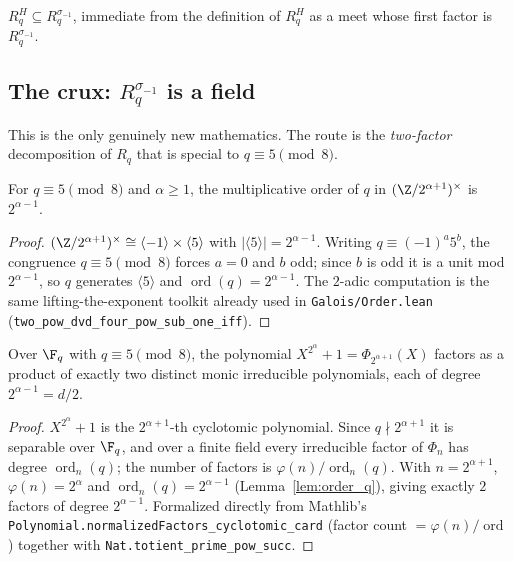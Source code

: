 \begin{lemma}[$R_q^H \le R_q^{\sigma_{-1}}$]\label{lem:fixedSubring_le_conjFixedSubring}
\leanok
{}
$R_q^H \subseteq R_q^{\sigma_{-1}}$, immediate from the definition of $R_q^H$ as a meet whose first
factor is $R_q^{\sigma_{-1}}$.
\end{lemma}

\subsection{The crux: \texorpdfstring{$R_q^{\sigma_{-1}}$}{R\_q\^{}σ(-1)} is a field}

This is the only genuinely new mathematics. The route is the \emph{two-factor} decomposition of
$R_q$ that is special to $q \equiv 5 \pmod 8$.

\begin{lemma}\label{lem:order_q}
\leanok
For $q \equiv 5 \pmod 8$ and $\alpha \ge 1$, the multiplicative order of $q$ in
$(\Z/2^{\alpha+1})^\times$ is $2^{\alpha-1}$.
\end{lemma}

\begin{proof}
$(\Z/2^{\alpha+1})^\times \cong \langle -1\rangle \times \langle 5\rangle$ with
$|\langle 5\rangle| = 2^{\alpha-1}$. Writing $q \equiv (-1)^a 5^b$, the congruence $q \equiv 5
\pmod 8$ forces $a = 0$ and $b$ odd; since $b$ is odd it is a unit mod $2^{\alpha-1}$, so
$q$ generates $\langle 5\rangle$ and $\operatorname{ord}(q) = 2^{\alpha-1}$. The $2$-adic
computation is the same lifting-the-exponent toolkit already used in
\texttt{Galois/Order.lean} (\texttt{two\_pow\_dvd\_four\_pow\_sub\_one\_iff}).
\end{proof}

\begin{lemma}\label{lem:two_factors}
\leanok
{}
Over $\F_q$ with $q \equiv 5 \pmod 8$, the polynomial $X^{2^\alpha}+1 = \Phi_{2^{\alpha+1}}(X)$
factors as a product of exactly two distinct monic irreducible polynomials, each of degree
$2^{\alpha-1} = d/2$.
\end{lemma}

\begin{proof}
$X^{2^\alpha}+1$ is the $2^{\alpha+1}$-th cyclotomic polynomial. Since $q \nmid 2^{\alpha+1}$ it is
separable over $\F_q$, and over a finite field every irreducible factor of $\Phi_n$ has degree
$\operatorname{ord}_n(q)$; the number of factors is $\varphi(n)/\operatorname{ord}_n(q)$. With
$n = 2^{\alpha+1}$, $\varphi(n) = 2^\alpha$ and $\operatorname{ord}_n(q) = 2^{\alpha-1}$
(Lemma~\ref{lem:order_q}), giving exactly $2$ factors of degree $2^{\alpha-1}$. Formalized directly
from Mathlib's \texttt{Polynomial.normalizedFactors\_cyclotomic\_card} (factor count $=
\varphi(n)/\operatorname{ord}$) together with \texttt{Nat.totient\_prime\_pow\_succ}.
\end{proof}

